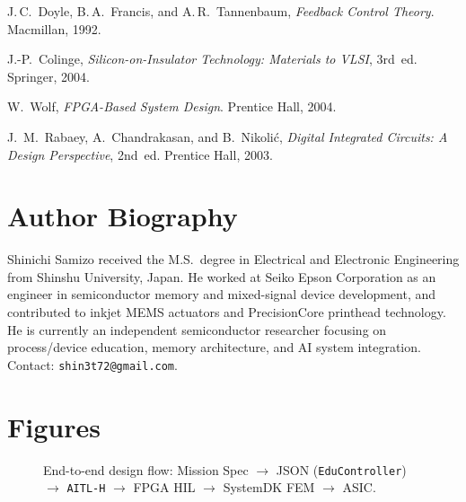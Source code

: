 \documentclass[conference]{IEEEtran}
\begin{document}
\begin{thebibliography}{99}
J.\,C.~Doyle, B.\,A.~Francis, and A.\,R.~Tannenbaum,
\emph{Feedback Control Theory}. Macmillan, 1992.

J.-P.~Colinge, \emph{Silicon-on-Insulator Technology: Materials to VLSI}, 3rd~ed. Springer, 2004.

W.~Wolf, \emph{FPGA-Based System Design}. Prentice Hall, 2004.

J.~M.~Rabaey, A.~Chandrakasan, and B.~Nikoli\'c, \emph{Digital Integrated Circuits: A Design Perspective}, 2nd~ed. Prentice Hall, 2003.
\end{thebibliography}

\section*{Author Biography}
Shinichi Samizo received the M.S.\ degree in Electrical and Electronic Engineering from Shinshu University, Japan. He worked at Seiko Epson Corporation as an engineer in semiconductor memory and mixed-signal device development, and contributed to inkjet MEMS actuators and PrecisionCore printhead technology. He is currently an independent semiconductor researcher focusing on process/device education, memory architecture, and AI system integration. Contact: \texttt{shin3t72@gmail.com}.

\FloatBarrier

\section*{Figures}

\begin{figure*}[!t]
\centering
{}
\caption{End-to-end design flow: Mission Spec \(\rightarrow\) JSON (\texttt{EduController}) \(\rightarrow\) \texttt{AITL-H} \(\rightarrow\) FPGA HIL \(\rightarrow\) SystemDK FEM \(\rightarrow\) ASIC.}
\label{fig:flow}
\end{figure*}
\end{document}
